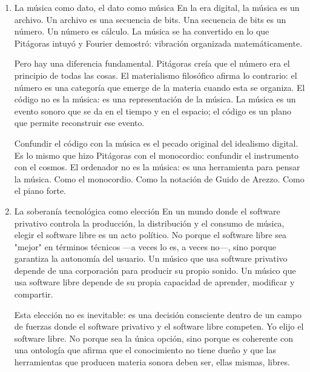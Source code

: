 \documentclass[14pt, a4paper]{article}
\begin{document}
\begin{enumerate}
Esta ecología no es un capricho: es una necesidad ontológica. Cada
programa es un género discontinuo de materialidad computacional.
Ninguno puede hacerlo todo. Pero entrelazados (\textbf{symploké}), producen
una totalidad que ninguno podría producir por separado.

Mi método es una herencia del jazz: cambio de pantallas, modifico el
código en la marcha, lo llevo al extremo. No parto de la nada:
modifico, forkéo, reapropio. La mayoría de mis códigos son
modificaciones de códigos libres. Como dicta la ética hacker: el
conocimiento no tiene dueño.
\item La música como dato, el dato como música
\label{musica-dato}
En la era digital, la música es un archivo. Un archivo es una
secuencia de bits. Una secuencia de bits es un número. Un número es
cálculo. La música se ha convertido en lo que Pitágoras intuyó y
Fourier demostró: vibración organizada matemáticamente.

Pero hay una diferencia fundamental. Pitágoras creía que el número era
el principio de todas las cosas. El materialismo filosófico afirma lo
contrario: el número es una categoría que emerge de la materia cuando
esta se organiza. El código no es la música: es una representación de
la música. La música es un evento sonoro que se da en el tiempo y en
el espacio; el código es un plano que permite reconstruir ese evento.

Confundir el código con la música es el pecado original del idealismo
digital. Es lo mismo que hizo Pitágoras con el monocordio: confundir
el instrumento con el cosmos. El ordenador no es la música: es una
herramienta para pensar la música. Como el monocordio. Como la
notación de Guido de Arezzo. Como el piano forte.
\item La soberanía tecnológica como elección
\label{soberania-tecnologica}
En un mundo donde el software privativo controla la producción, la
distribución y el consumo de música, elegir el software libre es un
acto político. No porque el software libre sea "mejor" en términos
técnicos —a veces lo es, a veces no—, sino porque garantiza la
autonomía del usuario. Un músico que usa software privativo depende de
una corporación para producir su propio sonido. Un músico que usa
software libre depende de su propia capacidad de aprender, modificar y
compartir.

Esta elección no es inevitable: es una decisión consciente dentro de
un campo de fuerzas donde el software privativo y el software libre
competen. Yo elijo el software libre. No porque sea la única opción,
sino porque es coherente con una ontología que afirma que el
conocimiento no tiene dueño y que las herramientas que producen
materia sonora deben ser, ellas mismas, libres.
\end{enumerate}
\end{document}
